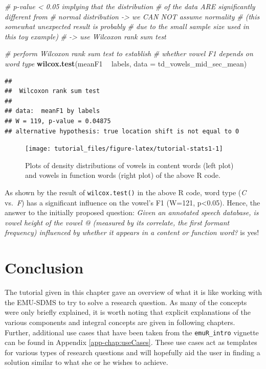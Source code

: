 \documentclass[]{book}
\newenvironment{Shaded}{\begin{snugshade}}{\end{snugshade}}
\newcommand{\CommentTok}[1]{\textcolor[rgb]{0.56,0.35,0.01}{\textit{#1}}}
\newcommand{\DataTypeTok}[1]{\textcolor[rgb]{0.13,0.29,0.53}{#1}}
\newcommand{\KeywordTok}[1]{\textcolor[rgb]{0.13,0.29,0.53}{\textbf{#1}}}
\newcommand{\NormalTok}[1]{#1}
\newcommand{\OperatorTok}[1]{\textcolor[rgb]{0.81,0.36,0.00}{\textbf{#1}}}
\newcommand{\StringTok}[1]{\textcolor[rgb]{0.31,0.60,0.02}{#1}}
\begin{document}
\begin{Shaded}
\begin{Highlighting}[]
\CommentTok{# p-value < 0.05 implying that the distribution}
\CommentTok{# of the data ARE significantly different from}
\CommentTok{# normal distribution -> we CAN NOT assume normality}
\CommentTok{# (this somewhat unexpected result is probably}
\CommentTok{# due to the small sample size used in this toy example)}
\CommentTok{# -> use Wilcoxon rank sum test}

\CommentTok{# perform Wilcoxon rank sum test to establish}
\CommentTok{# whether vowel F1 depends on word type}
\KeywordTok{wilcox.test}\NormalTok{(meanF1 }\OperatorTok{~}\StringTok{ }\NormalTok{labels, }\DataTypeTok{data =}\NormalTok{ td_vowels_mid_sec_mean)}
\end{Highlighting}
\end{Shaded}

\begin{verbatim}
## 
##  Wilcoxon rank sum test
## 
## data:  meanF1 by labels
## W = 119, p-value = 0.04875
## alternative hypothesis: true location shift is not equal to 0
\end{verbatim}

\begin{figure}

{\centering \texttt{[image: tutorial\_files/figure-latex/tutorial-stats1-1]} 

}

\caption{Plots of density distributions of vowels in content words (left plot) and vowels in function words (right plot) of the above R code.}\label{fig:tutorial-stats1}
\end{figure}

As shown by the result of \texttt{wilcox.test()} in the above R code, word type (\emph{C} vs.~\emph{F}) has a significant influence on the vowel's F1 (W=121, p\textless{}0.05). Hence, the answer to the initially proposed question: \emph{Given an annotated speech database, is vowel height of the vowel @ (measured by its correlate, the first formant frequency) influenced by whether it appears in a content or function word?} is yes!

\hypertarget{conclusion}{%
\section{Conclusion}\label{conclusion}}

The tutorial given in this chapter gave an overview of what it is like working with the EMU-SDMS to try to solve a research question. As many of the concepts were only briefly explained, it is worth noting that explicit explanations of the various components and integral concepts are given in following chapters. Further, additional use cases that have been taken from the \texttt{emuR\_intro} vignette can be found in Appendix \ref{app-chap:useCases}. These use cases act as templates for various types of research questions and will hopefully aid the user in finding a solution similar to what she or he wishes to achieve.
\end{document}

